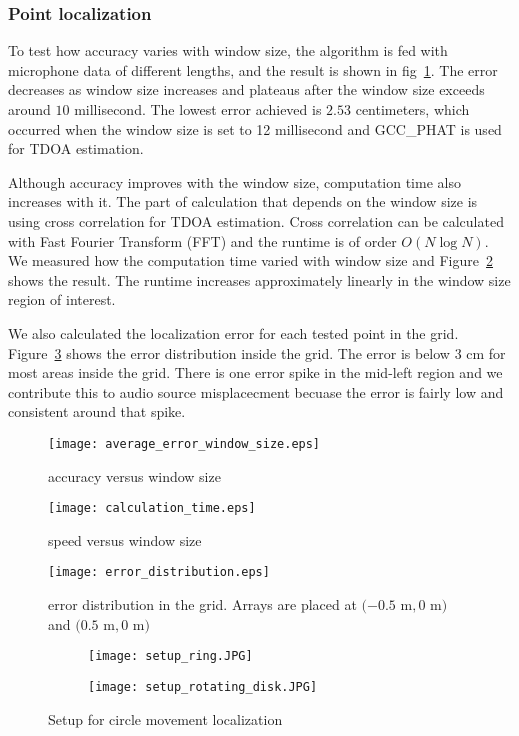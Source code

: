 \subsubsection{Point localization}
To test how accuracy varies with window size, the algorithm is fed with microphone data of different lengths, and the result is shown in fig~\ref{fig:accuracy_vs_window}. The error decreases as window size increases and plateaus after the window size exceeds around $10$ millisecond. The lowest error achieved is $2.53$ centimeters, which occurred when the window size is set to 12 millisecond and GCC\_PHAT is used for TDOA estimation.

Although accuracy improves with the window size, computation time also increases with it. The part of calculation that depends on the window size is using cross correlation for TDOA estimation. Cross correlation can be calculated with Fast Fourier Transform (FFT) and the runtime is of order $O(N\log N)$. We measured how the computation time varied with window size and Figure~\ref{fig:speed_vs_window} shows the result. The runtime increases approximately linearly in the window size region of interest.

We also calculated the localization error for each tested point in the grid. Figure~\ref{fig:error_distribution} shows the error distribution inside the grid. The error is below $3$ cm for most areas inside the grid. There is one error spike in the mid-left region and we contribute this to audio source misplacecment becuase the error is fairly low and consistent around that spike.

\begin{figure}[]
\texttt{[image: average\_error\_window\_size.eps]}
\caption{accuracy versus window size}
\label{fig:accuracy_vs_window}
\end{figure}

\begin{figure}[]
\centering
\texttt{[image: calculation\_time.eps]}
\caption{speed versus window size}
\label{fig:speed_vs_window}
\end{figure}


\begin{figure}[]
\centering
\texttt{[image: error\_distribution.eps]}
\caption{error distribution in the grid. Arrays are placed at $(-0.5$ m$, 0$ m$)$ and $(0.5$ m$, 0$ m$)$}
\label{fig:error_distribution}
\end{figure}

\begin{figure}[]
  \centering
  \begin{subfigure}[]{.2\textwidth}
    \texttt{[image: setup\_ring.JPG]}
  \end{subfigure}
  \begin{subfigure}[]{.2\textwidth}
    \texttt{[image: setup\_rotating\_disk.JPG]}
  \end{subfigure}
  \caption{Setup for circle movement localization}
  \label{fig:setup_circle}
\end{figure}


